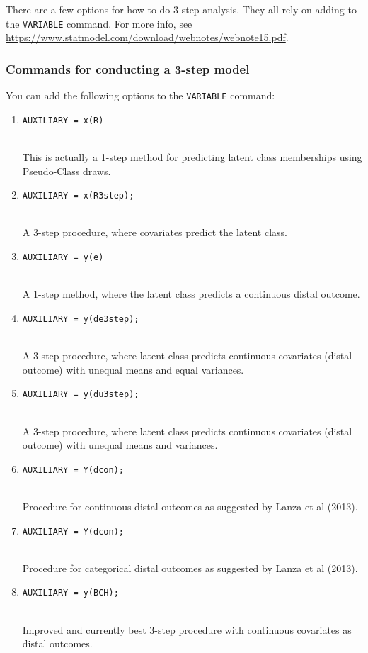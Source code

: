 \documentclass[
]{book}
\providecommand{\tightlist}{%
  \setlength{\itemsep}{0pt}\setlength{\parskip}{0pt}}
\begin{document}
There are a few options for how to do 3-step analysis. They all rely on adding to the \texttt{VARIABLE} command. For more info, see \url{https://www.statmodel.com/download/webnotes/webnote15.pdf}.

\hypertarget{commands-for-conducting-a-3-step-model}{%
\subsubsection{Commands for conducting a 3-step model}\label{commands-for-conducting-a-3-step-model}}

You can add the following options to the \texttt{VARIABLE} command:

\begin{enumerate}
\def\labelenumi{\arabic{enumi}.}
\tightlist
\item
  \texttt{AUXILIARY\ =\ x(R)}\strut \\
  This is actually a 1-step method for predicting latent class memberships using Pseudo-Class draws.
\item
  \texttt{AUXILIARY\ =\ x(R3step);}\strut \\
  A 3-step procedure, where covariates predict the latent class.
\item
  \texttt{AUXILIARY\ =\ y(e)}\strut \\
  A 1-step method, where the latent class predicts a continuous distal outcome.
\item
  \texttt{AUXILIARY\ =\ y(de3step);}\strut \\
  A 3-step procedure, where latent class predicts continuous covariates (distal outcome) with unequal means and equal variances.
\item
  \texttt{AUXILIARY\ =\ y(du3step);}\strut \\
  A 3-step procedure, where latent class predicts continuous covariates (distal outcome) with unequal means and variances.
\item
  \texttt{AUXILIARY\ =\ Y(dcon);}\strut \\
  Procedure for continuous distal outcomes as suggested by Lanza et al (2013).
\item
  \texttt{AUXILIARY\ =\ Y(dcon);}\strut \\
  Procedure for categorical distal outcomes as suggested by Lanza et al (2013).
\item
  \texttt{AUXILIARY\ =\ y(BCH);}\strut \\
  Improved and currently best 3-step procedure with continuous covariates as distal outcomes.
\end{enumerate}
\end{document}
